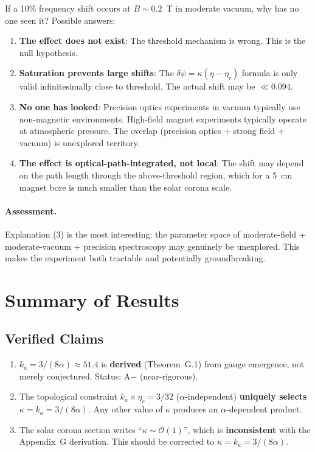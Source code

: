 \documentclass[12pt,a4paper]{article}
\theoremstyle{remark}
\begin{document}
If a 10\% frequency shift occurs at $B \sim 0.2$~T in moderate vacuum,
why has no one seen it? Possible answers:
\begin{enumerate}
\item \textbf{The effect does not exist}: The threshold mechanism is wrong.
  This is the null hypothesis.

\item \textbf{Saturation prevents large shifts}: The $\delta\psi = \kappa(\eta - \eta_c)$
  formula is only valid infinitesimally close to threshold. The actual shift
  may be $\ll 0.094$.

\item \textbf{No one has looked}: Precision optics experiments in vacuum
  typically use non-magnetic environments. High-field magnet experiments
  typically operate at atmospheric pressure. The overlap (precision optics
  + strong field + vacuum) is unexplored territory.

\item \textbf{The effect is optical-path-integrated, not local}: The shift
  may depend on the path length through the above-threshold region, which
  for a 5~cm magnet bore is much smaller than the solar corona scale.
\end{enumerate}

\paragraph{Assessment.}
Explanation (3) is the most interesting: the parameter space of
moderate-field + moderate-vacuum + precision spectroscopy may genuinely
be unexplored. This makes the experiment both tractable and potentially
groundbreaking.

\section{Summary of Results}

\subsection{Verified Claims}

\begin{enumerate}
\item $k_a = 3/(8\alpha) \approx 51.4$ is \textbf{derived} (Theorem~G.1)
  from gauge emergence, not merely conjectured. Status: A$-$ (near-rigorous).

\item The topological constraint $k_a \times \eta_c = 3/32$ ($\alpha$-independent)
  \textbf{uniquely selects} $\kappa = k_a = 3/(8\alpha)$. Any other value
  of $\kappa$ produces an $\alpha$-dependent product.

\item The solar corona section writes ``$\kappa \sim \mathcal{O}(1)$'', which
  is \textbf{inconsistent} with the Appendix~G derivation. This should be
  corrected to $\kappa = k_a = 3/(8\alpha)$.
\end{enumerate}
\end{document}
